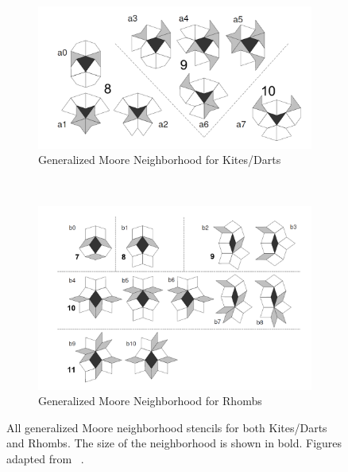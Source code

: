 \documentclass[a4paper,11pt,twoside]{report}
\begin{document}
\begin{figure}[htp]
\centering
\begin{subfigure}[t]{0.6\textwidth}
	\centering
	\includegraphics[width=\textwidth]{ch4_figs/ow08_fig18_kd_nbd}
	\caption{Generalized Moore Neighborhood for Kites/Darts}
\end{subfigure}
~
\begin{subfigure}[t]{0.6\textwidth}
	\centering
	\includegraphics[width=\textwidth]{ch4_figs/ow08_fig20_rh_nbd}
	\caption{Generalized Moore Neighborhood for Rhombs}
\end{subfigure}

\caption[Generalized Moore Neighborhoods for Kites/Darts and Rhombs]{
	All generalized Moore neighborhood stencils for both Kites/Darts and Rhombs. The size of the neighborhood is shown in bold. Figures adapted from 
	\citeauthor{ow08}~\cite{ow08}.
}
\label{fig:ow08_nbd_stencils}
\end{figure}
\end{document}
